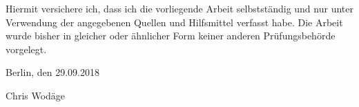 
Hiermit versichere ich, dass ich die vorliegende Arbeit selbstständig und nur unter
Verwendung der angegebenen Quellen und Hilfsmittel verfasst habe. Die Arbeit wurde bisher
in gleicher oder ähnlicher Form keiner anderen Prüfungsbehörde vorgelegt.

\vskip 1cm

Berlin, den 29.09.2018

\vskip 1.5cm

Chris Wodäge
